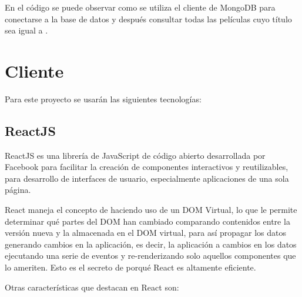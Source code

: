 En el código se puede observar como se utiliza el cliente de MongoDB para conectarse a la base de datos  y después consultar todas las películas cuyo título sea igual a .

\section{Cliente}

Para este proyecto se usarán las siguientes tecnologías:

\subsection{ReactJS}

ReactJS es una librería de JavaScript de código abierto desarrollada por Facebook para facilitar la creación de componentes interactivos y reutilizables, para desarrollo de interfaces de usuario, especialmente aplicaciones de una sola página.

React maneja el concepto de  \cite{ReactiveProgramming} haciendo uso de un DOM Virtual, lo que le permite determinar qué partes del DOM han cambiado comparando contenidos entre la versión nueva y la almacenada en el DOM virtual, para así propagar los datos generando cambios en la aplicación, es decir, la aplicación  a cambios en los datos ejecutando una serie de eventos y re-renderizando solo aquellos componentes que lo ameriten. Esto es el secreto de porqué React es altamente eficiente.

Otras características que destacan en React son:

